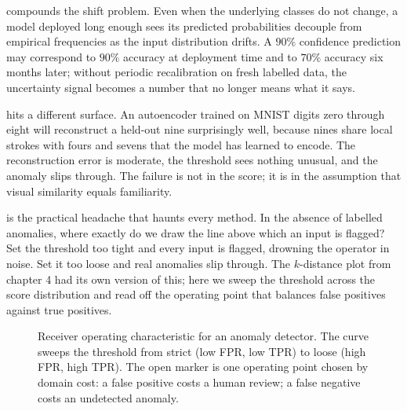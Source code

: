 compounds the shift problem.
Even when the underlying classes do not change, a model deployed long enough sees its predicted probabilities decouple from empirical frequencies as the input distribution drifts.
A $90\%$ confidence prediction may correspond to $90\%$ accuracy at deployment time and to $70\%$ accuracy six months later; without periodic recalibration on fresh labelled data, the uncertainty signal becomes a number that no longer means what it says.

 hits a different surface.
An autoencoder trained on MNIST digits zero through eight will reconstruct a held-out nine surprisingly well, because nines share local strokes with fours and sevens that the model has learned to encode.
The reconstruction error is moderate, the threshold sees nothing unusual, and the anomaly slips through.
The failure is not in the score; it is in the assumption that visual similarity equals familiarity.

 is the practical headache that haunts every method.
In the absence of labelled anomalies, where exactly do we draw the line above which an input is flagged?
Set the threshold too tight and every input is flagged, drowning the operator in noise.
Set it too loose and real anomalies slip through.
The $k$-distance plot from chapter 4 had its own version of this; here we sweep the threshold across the score distribution and read off the operating point that balances false positives against true positives.

\begin{figure}
\centering
{}
\caption{Receiver operating characteristic for an anomaly detector. The curve sweeps the threshold from strict (low FPR, low TPR) to loose (high FPR, high TPR). The open marker is one operating point chosen by domain cost: a false positive costs a human review; a false negative costs an undetected anomaly.}
\label{fig:roc_curve}
\end{figure}

